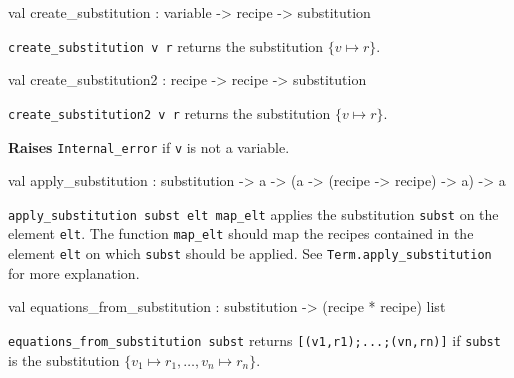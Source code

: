 \label{val:Recipe.create-underscoresubstitution}\begin{ocamldoccode}
val create_substitution : variable -> recipe -> substitution
\end{ocamldoccode}
\begin{ocamldocdescription}
{\tt{create\_substitution v r}} returns the substitution $\{v \mapsto r\}$. 


\end{ocamldocdescription}




\label{val:Recipe.create-underscoresubstitution2}\begin{ocamldoccode}
val create_substitution2 : recipe -> recipe -> substitution
\end{ocamldoccode}
\begin{ocamldocdescription}
{\tt{create\_substitution2 v r}} returns the substitution $\{v \mapsto r\}$. 

{\bf Raises} {\tt{Internal\_error}} if {\tt{v}} is not a variable.


\end{ocamldocdescription}




\label{val:Recipe.apply-underscoresubstitution}\begin{ocamldoccode}
val apply_substitution :
  substitution ->
  {\textquotesingle}a -> ({\textquotesingle}a -> (recipe -> recipe) -> {\textquotesingle}a) -> {\textquotesingle}a
\end{ocamldoccode}
\begin{ocamldocdescription}
{\tt{apply\_substitution subst elt map\_elt}} applies the substitution {\tt{subst}} on the element {\tt{elt}}. The function
    {\tt{map\_elt}} should map the recipes contained in the element {\tt{elt}} on which {\tt{subst}} should be applied.
    See {\tt{Term.apply\_substitution}} for more explanation.


\end{ocamldocdescription}




\label{val:Recipe.equations-underscorefrom-underscoresubstitution}\begin{ocamldoccode}
val equations_from_substitution : substitution -> (recipe * recipe) list
\end{ocamldoccode}
\begin{ocamldocdescription}
{\tt{equations\_from\_substitution subst}} returns {\tt{[(v1,r1);...;(vn,rn)]}}
    if {\tt{subst}} is the substitution $\{ v_1 \mapsto r_1, \ldots, v_n \mapsto r_n \}$. 


\end{ocamldocdescription}




